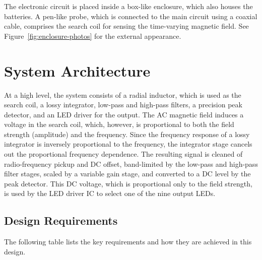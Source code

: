 \documentclass[11pt,a4paper]{article}
\begin{document}
The electronic circuit is placed inside a box-like enclosure, which also houses the batteries. A pen-like probe, which is connected to the main circuit using a coaxial cable, comprises the search coil for sensing the time-varying magnetic field. See Figure~\ref{fig:enclosure-photos} for the external appearance.

\section{System Architecture}
\label{sec:architecture}

At a high level, the system consists of a radial inductor, which is used as the search coil, a lossy integrator, low-pass and high-pass filters, a precision peak detector, and an LED driver for the output. The AC magnetic field induces a voltage in the search coil, which, however, is proportional to both the field strength (amplitude) and the frequency. Since the frequency response of a lossy integrator is inversely proportional to the frequency, the integrator stage cancels out the proportional frequency dependence. The resulting signal is cleaned of radio-frequency pickup and DC offset, band-limited by the low-pass and high-pass filter stages, scaled by a variable gain stage, and converted to a DC level by the peak detector. This DC voltage, which is proportional only to the field strength, is used by the LED driver IC to select one of the nine output LEDs.

\subsection{Design Requirements}
\label{sec:arch-req}

The following table lists the key requirements and how they are achieved in this design.
\end{document}
